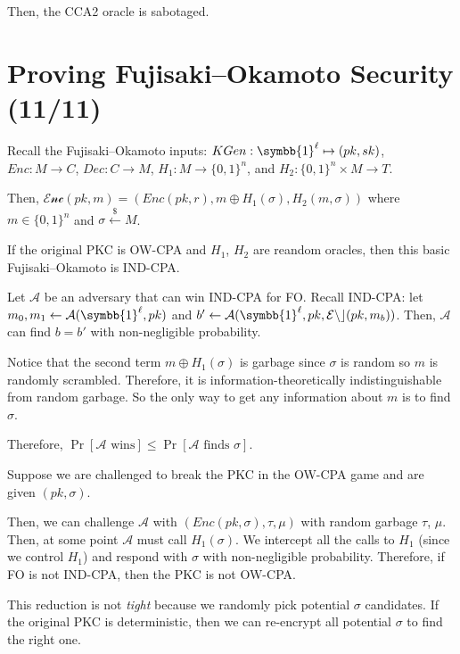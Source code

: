 \documentclass[notes]{agony}
\newcommand{\xgets}{\xleftarrow}
\newcommand{\one}{\symbb{1}}
\begin{document}
Then, the CCA2 oracle is sabotaged.

\section{Proving Fujisaki--Okamoto Security (11/11)}

Recall the Fujisaki--Okamoto inputs:
$KGen : \one^\ell \mapsto (pk, sk)$,
$Enc : M \to C$,
$Dec : C \to M$,
$H_1 : M \to \{0,1\}^n$, and
$H_2 : \{0,1\}^n \times M \to T$.

Then, $\mathcal{Enc}(pk, m) = (Enc(pk, r), m \oplus H_1(\sigma), H_2(m, \sigma))$
where $m \in \{0,1\}^n$ and $\sigma \xgets{\$} M$.

\begin{theorem}
  If the original PKC is OW-CPA and $H_1$, $H_2$ are reandom oracles,
  then this basic Fujisaki--Okamoto is IND-CPA.
\end{theorem}
\begin{prf}
  Let $\mathcal{A}$ be an adversary that can win IND-CPA for FO.
  Recall IND-CPA: let $m_0,m_1 \gets \mathcal{A}(\one^\ell, pk)$
  and $b' \gets \mathcal{A}(\one^\ell, pk, \mathcal{Enc}(pk, m_b))$.
  Then, $\mathcal{A}$ can find $b = b'$ with non-negligible probability.

  Notice that the second term $m \oplus H_1(\sigma)$ is garbage
  since $\sigma$ is random so $m$ is randomly scrambled.
  Therefore, it is information-theoretically indistinguishable from random garbage.
  So the only way to get any information about $m$ is to find $\sigma$.

  Therefore, $\Pr[\text{$\mathcal{A}$ wins}] \leq \Pr[\text{$\mathcal{A}$ finds $\sigma$}]$.

  Suppose we are challenged to break the PKC in the OW-CPA game
  and are given $(pk,\sigma)$.

  Then, we can challenge $\mathcal{A}$
  with $(Enc(pk, \sigma), \tau, \mu)$ with random garbage $\tau$, $\mu$.
  Then, at some point $\mathcal{A}$ must call $H_1(\sigma)$.
  We intercept all the calls to $H_1$ (since we control $H_1$)
  and respond with $\sigma$ with non-negligible probability.
  Therefore, if FO is not IND-CPA, then the PKC is not OW-CPA.
\end{prf}

This reduction is not \emph{tight} because we randomly pick potential $\sigma$ candidates.
If the original PKC is deterministic,
then we can re-encrypt all potential $\sigma$ to find the right one.
\end{document}

